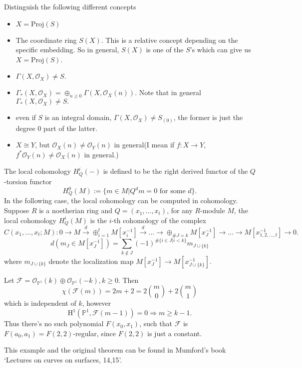 \documentclass[../main.tex]{subfiles}
\begin{document}
\begin{remark}
Distinguish the following different concepts
\begin{itemize}
\item $X=\mathrm{Proj}(S)$
\item The coordinate ring $S(X)$. This is a relative concept depending on the specific embedding. So in general, $S(X)$ is one of the $S$'s which can give us $X=\mathrm{Proj}(S)$. 
\item $\Gamma(X,\mathcal{O}_{X})\neq S.$
\item $\Gamma_{*}(X,\mathcal{O}_{X})=\oplus_{n\geq 0}\Gamma(X,\mathcal{O}_{X}(n))$. Note that in general $\Gamma_{*}(X,\mathcal{O}_{X})\neq S.$
\item even if $S$ is an integral domain, $\Gamma(X,\mathcal{O}_{X})\neq S_{(0)}$, the former is just the degree $0$ part of the latter.
\item $X\cong Y$, but $\mathcal{O}_{X}(n)\neq \mathcal{O}_{Y}(n)$ in general(I mean if $f:X\rightarrow Y$, $f^{*}\mathcal{O}_{Y}(n)\neq \mathcal{O}_{X}(n)$ in general.)
\end{itemize}

\end{remark}






\begin{remark}
The local cohomology $H_{Q}^{i}(-)$ is defined to be the right derived functor of the $Q$-torsion functor
$$H_{Q}^{0}(M):=\{m\in M|Q^{d}m=0 \text{ for some $d$}\}.$$
In the following case, the local cohomology can be computed in \Cech cohomology. Suppose $R$ is a noetherian ring and $Q=(x_{1}, \dots, x_{t})$, for any $R$-module $M$, the local cohomology $H_{Q}^{i}(M)$ is the $i$-th cohomology of the complex
$$C(x_{1}, \dots, x_{t}; M):0\rightarrow M\xrightarrow{d}\oplus_{i=1}^{t} M[x_{i}^{-1}]\xrightarrow{d}\dots \rightarrow \oplus_{\# J=k}M[x_{J}^{-1}]\rightarrow \dots \rightarrow M[x_{1,2,\dots, t}^{-1}]\rightarrow 0.$$
$$d(m_{J}\in M[x_{J}^{-1}])=\sum_{k\notin J}(-1)^{\#\{i\in J|i<k\}}m_{J\cup\{k\}}$$
where $m_{J\cup\{k\}}$ denote the localization map $M[x_{J}^{-1}]\rightarrow M[x_{J\cup\{k\}}^{-1}]$.
\end{remark}



\begin{example}
Let $\mathscr{F}=\mathcal{O}_{\mathbb{P}^{1}}(k)\oplus \mathcal{O}_{\mathbb{P}^{1}}(-k), k\geq 0$. Then 
$$\chi(\mathscr{F}(m))=2m+2=2\binom{m}{0}+2\binom{m}{1}$$
which is independent of $k$, however
$$\mathrm{H}^{1}(\mathbb{P}^{1}, \mathscr{F}(m-1))=0\Rightarrow m\geq k-1.$$
Thus there's no such polynomial $F(x_{0}, x_{1})$, such that $\mathscr{F}$ is $F(a_{0}, a_{1})=F(2,2)$-regular, since $F(2,2)$ is just a constant. 
\end{example}
\begin{remark}
This example and the original theorem can be found in Mumford's book `Lectures on curves on surfaces, 14,15'.
\end{remark}
\end{document}
